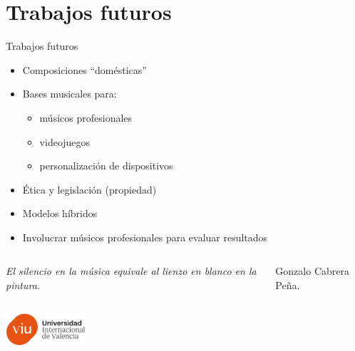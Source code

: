 \documentclass{beamer}
\newcommand{\currentsectionindex}{0}
\begin{document}
\renewcommand{\currentsectionindex}{8}
\section{Trabajos futuros}
\begin{frame}{Trabajos futuros}
  \begin{itemize}
  \item Composiciones ``domésticas''
  \item Bases musicales para:
    \begin{itemize}
      \item músicos profesionales
      \item videojuegos
      \item personalización de dispositivos
    \end{itemize}
    \item Ética y legislación (propiedad)
    \item Modelos híbridos
    \item Involucrar músicos profesionales para evaluar resultados
  \end{itemize}
\end{frame}

\begin{frame}
  \vspace{2cm}
  \begin{columns}
    \column{12cm}
    \begin{flushright}
      \emph{El silencio en la música equivale al lienzo en blanco en la pintura.}\\
    \end{flushright}
    \vspace{0.5cm}
    \begin{flushright}
      Gonzalo Cabrera Peña.
    \end{flushright}
  \end{columns}
  \vspace{1cm}
  \begin{center}
    \includegraphics[width=3cm]{images/viu_logo.png}
  \end{center} 
\end{frame}
\end{document}
